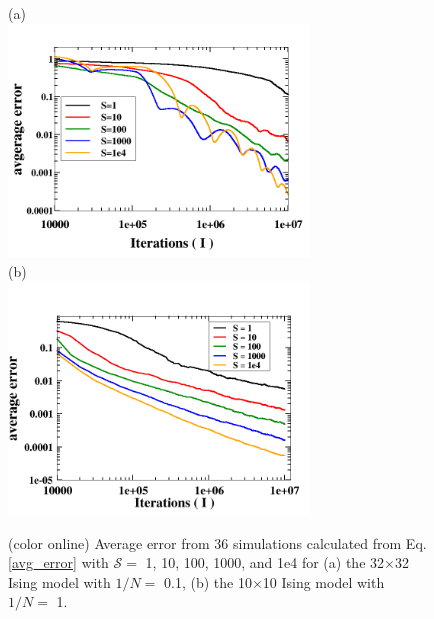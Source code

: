 \documentclass[aps,pre,reprint,superscriptaddress,showkeys]{revtex4-1}
\begin{document}
\begin{figure}[h!]
(a)\\
\includegraphics[width=8cm]{./figures/thirtytwo_root0_1_varyS.png}\\
(b)\\
\includegraphics[width=8cm]{./figures/10X10_root1_varyS.png}
\caption{(color online) Average error from 36 simulations calculated from Eq. \ref{avg_error} with $\mathcal{S}=$ 1, 10, 100, 1000, and 1e4 for  (a) the 32$\times$32 Ising model with $1/N=$ 0.1, (b) the 10$\times$10 Ising model with $1/N =$ 1. \label{thirtytwo_Stest} }
\end{figure}
\end{document}
